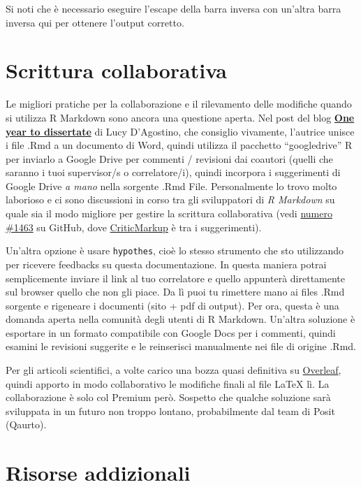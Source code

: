 \documentclass[a4paper, 11pt, nobind]{templates/ociamthesis}
\begin{document}
Si noti che è necessario eseguire l'escape della barra inversa con un'altra barra inversa qui per ottenere l'output corretto.

\hypertarget{scrittura-collaborativa}{%
\section{Scrittura collaborativa}\label{scrittura-collaborativa}}

Le migliori pratiche per la collaborazione e il rilevamento delle modifiche quando si utilizza R Markdown sono ancora una questione aperta.
Nel post del blog \href{https://livefreeordichotomize.com/2018/09/14/one-year-to-dissertate/}{\textbf{One year to dissertate}} di Lucy D'Agostino, che consiglio vivamente, l'autrice unisce i file .Rmd a un documento di Word, quindi utilizza il pacchetto ``googledrive'' R per inviarlo a Google Drive per commenti / revisioni dai coautori (quelli che saranno i tuoi supervisor/s o correlatore/i), quindi incorpora i suggerimenti di Google Drive \emph{a mano} nella sorgente .Rmd File.
Personalmente lo trovo molto laborioso e ci sono discussioni in corso tra gli sviluppatori di \emph{R Markdown} su quale sia il modo migliore per gestire la scrittura collaborativa (vedi \href{https://github.com/rstudio/rmarkdown/issues/1463}{numero \#1463} su GitHub, dove \href{http://criticmarkup.com}{CriticMarkup} è tra i suggerimenti).

Un'altra opzione è usare \texttt{hypothes}, cioè lo stesso strumento che sto utilizzando per ricevere feedbacks su questa documentazione. In questa maniera potrai semplicemente inviare il link al tuo correlatore e quello appunterà direttamente sul browser quello che non gli piace. Da lì puoi tu rimettere mano ai files .Rmd sorgente e rigeneare i documenti (sito + pdf di output).
Per ora, questa è una domanda aperta nella comunità degli utenti di R Markdown.
Un'altra soluzione è esportare in un formato compatibile con Google Docs per i commenti, quindi esamini le revisioni suggerite e le reinserisci manualmente nei file di origine .Rmd.

Per gli articoli scientifici, a volte carico una bozza quasi definitiva su \href{https://www.overleaf.com/}{Overleaf}, quindi apporto in modo collaborativo le modifiche finali al file LaTeX lì. La collaborazione è solo col Premium però.
Sospetto che qualche soluzione sarà sviluppata in un futuro non troppo lontano, probabilmente dal team di Posit (Qaurto).

\hypertarget{risorse-addizionali}{%
\section{Risorse addizionali}\label{risorse-addizionali}}
\end{document}
